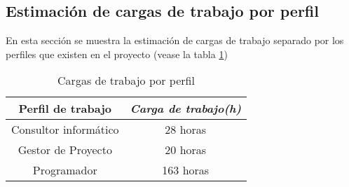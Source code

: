 \subsection{Estimación de cargas de trabajo por perfil}

En esta sección se muestra la estimación de cargas de trabajo separado por los perfiles que existen en el proyecto (vease la tabla \ref{tab:workload})

\begin{table}[htp]
	\centering
	\caption{Cargas de trabajo por perfil}\label{tab:workload}
	\begin{tabular}{cc}
		\toprule
    	\textbf{Perfil de trabajo} & \emph{Carga de trabajo(h)}\\
    	\midrule
		Consultor informático	&	28 horas\\
		Gestor de Proyecto		&	20 horas\\
		Programador				&	163 horas\\
    	\bottomrule
    \end{tabular}
\end{table}